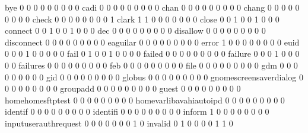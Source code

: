 \documentclass[compress,8pt]{beamer}
\begin{document}
\begin{frame}
\begin{Schunk}
  bye                                        0   0   0   0   0   0   0   0   0
  cadi                                       0   0   0   0   0   0   0   0   0
  chan                                       0   0   0   0   0   0   0   0   0
  chang                                      0   0   0   0   0   0   0   0   0
  check                                      0   0   0   0   0   0   0   0   1
  clark                                      1   1   0   0   0   0   0   0   0
  close                                      0   0   1   0   0   1   0   0   0
  connect                                    0   0   1   0   0   1   0   0   0
  dec                                        0   0   0   0   0   0   0   0   0
  disallow                                   0   0   0   0   0   0   0   0   0
  disconnect                                 0   0   0   0   0   0   0   0   0
  eaguilar                                   0   0   0   0   0   0   0   0   0
  error                                      1   0   0   0   0   0   0   0   0
  euid                                       0   0   0   1   0   0   0   0   0
  fail                                       0   1   0   0   1   0   0   0   0
  failed                                     0   0   0   0   0   0   0   0   0
  failure                                    0   0   0   1   0   0   0   0   0
  failures                                   0   0   0   0   0   0   0   0   0
  feb                                        0   0   0   0   0   0   0   0   0
  file                                       0   0   0   0   0   0   0   0   0
  gdm                                        0   0   0   0   0   0   0   0   0
  gid                                        0   0   0   0   0   0   0   0   0
  globus                                     0   0   0   0   0   0   0   0   0
  gnomescreensaverdialog                     0   0   0   0   0   0   0   0   0
  groupadd                                   0   0   0   0   0   0   0   0   0
  guest                                      0   0   0   0   0   0   0   0   0
  homehomesftptest                           0   0   0   0   0   0   0   0   0
  homevarlibavahiautoipd                     0   0   0   0   0   0   0   0   0
  identif                                    0   0   0   0   0   0   0   0   0
  identifi                                   0   0   0   0   0   0   0   0   0
  inform                                     1   0   0   0   0   0   0   0   0
  inputuserauthrequest                       0   0   0   0   0   0   0   1   0
  invalid                                    0   1   0   0   0   0   1   1   0

\end{Schunk}
\end{frame}
\end{document}
